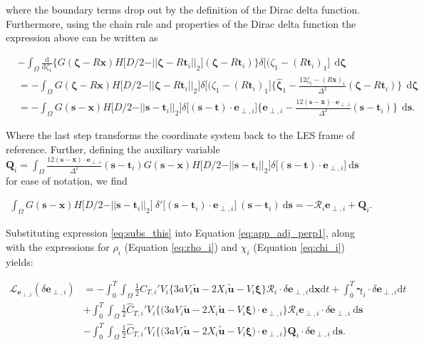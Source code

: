 \documentclass[energies,article,submit,moreauthors,latex,10pt,a4paper]{mdpi}
\newcommand{\ds}{~\text{d}\boldsymbol{s}}
\newcommand{\dzeta}{~\text{d}\boldsymbol{\zeta}}
\newcommand{\bs}[1]{\boldsymbol{#1}}
\newcommand{\dx}{\text{d}\boldsymbol{x}}
\newcommand{\dt}{\text{d}t}
\newcommand{\stint}{\int_{0}^{T} \int_{\Omega}}
\newcommand{\sint}{\int_{\Omega}}
\newcommand{\Tint}{\int_{0}^{T}}
\newcommand{\utilde}{\widetilde{\bs{u}}}
\newcommand{\ctihat}{\widehat{C}_{T,i}'}
\newcommand{\R}{\mathscr{R}}
\newcommand{\Lagr}{\mathscr{L}}
\newcommand{\eperpi}{\bs{e}_{\perp,i}}
\newcommand{\diracdelta}{{\delta}}
\begin{document}
\noindent where the boundary terms drop out by the definition of the Dirac delta function. Furthermore, using the chain rule and properties of the Dirac delta function the expression above can be written as 

\begin{align}
&- \sint \frac{\text{d}}{\text{d}\zeta_1} \bigg\{ G(\bs{\zeta} - R\bs{x})  H\big[D/2 - \vert\vert \bs{\zeta} - R\bs{t}_i \vert\vert_2 \big] (\bs{\zeta} - R\bs{t}_i)  \bigg\} \diracdelta\big[(\zeta_1 - (R\bs{t}_i)_1 \big]~ \dzeta \nonumber\\
&=- \sint G(\bs{\zeta} - R\bs{x})  H\big[D/2 - \vert\vert \bs{\zeta} - R\bs{t}_i \vert\vert_2 \big] \diracdelta\big[(\zeta_1 - (R\bs{t}_i)_1 \big] \bigg\{ \hat{\bs{\zeta}}_1 - \frac{12 \zeta_1 - (R\bs{x})_1}{\Delta^2} (\bs{\zeta} - R \bs{t}_i) \bigg\} ~ \dzeta \nonumber \\
&=- \sint G(\bs{s} - \bs{x})  H\big[D/2 - \vert\vert \bs{s} - \bs{t}_i \vert\vert_2 \big] \diracdelta\big[(\bs{s} - \bs{t})\cdot \eperpi \big] \bigg\{ \eperpi - \frac{12 (\bs{s} - \bs{x})\cdot \eperpi}{\Delta^2} (\bs{s} - \bs{t}_i) \bigg\} ~ \ds.
\end{align}

\noindent Where the last step transforms the coordinate system back to the LES frame of reference. Further, defining the auxiliary variable $\bs{Q}_i = \sint \frac{12 (\bs{s} - \bs{x})\cdot \eperpi}{\Delta^2} (\bs{s} - \bs{t}_i) G(\bs{s} - \bs{x})  H\big[D/2 - \vert\vert \bs{s} - \bs{t}_i \vert\vert_2 \big] \diracdelta\big[(\bs{s} - \bs{t})\cdot \eperpi \big] \ds$ for ease of notation, we find

\begin{align}
\sint G(\bs{s} - \bs{x})  H\big[D/2 - \vert\vert \bs{s} - \bs{t}_i \vert\vert_2 \big]~\diracdelta'\big[(\bs{s} - \bs{t}_i) \cdot \eperpi \big]~(\bs{s} - \bs{t}_i)  \ds 
=  - \R_i \eperpi + \bs{Q}_i. \label{eq:subs_this}
\end{align}

\noindent Substituting expression \eqref{eq:subs_this} into Equation \eqref{eq:app_adj_perp1}, along with the expressions for $\rho_i$ (Equation \ref{eq:rho_i}) and $\chi_i$ (Equation \ref{eq:chi_i}) yields:

\begin{align}
\Lagr_{\eperpi}(\delta \eperpi) &= - \stint \frac{1}{2} \ctihat V_i \bigg\{ 3a V_i \utilde  - 2 X_i \utilde - V_i\bs{\xi}   \bigg\} \R_i \cdot \delta \eperpi \dx \dt + \Tint \bs{\gamma}_i \cdot \delta \eperpi \dt \nonumber\\
& + \stint \frac{1}{2} \ctihat V_i \bigg\{ \bigg(3aV_i \utilde  -2 X_i \utilde - V_i\bs{\xi} \bigg) \cdot \eperpi \bigg\} \R_i \eperpi \cdot \delta \eperpi \ds \nonumber \\
& - \stint \frac{1}{2} \ctihat V_i \bigg\{ \bigg(3aV_i \utilde  -2 X_i \utilde - V_i\bs{\xi} \bigg) \cdot \eperpi \bigg\} \bs{Q}_i \cdot \delta \eperpi \ds. 
\end{align}
\end{document}
